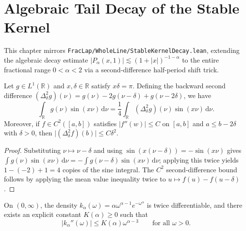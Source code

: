 \chapter{Algebraic Tail Decay of the Stable Kernel}

This chapter mirrors \texttt{FracLap/WholeLine/StableKernelDecay.lean}, extending the algebraic decay estimate $\lvert P_\alpha(x, 1) \rvert \lesssim (1 + \lvert x \rvert)^{-1-\alpha}$ to the entire fractional range $0 < \alpha < 2$ via a second-difference half-period shift trick.

\begin{lemma}\label{lem:sin_second_diff_identity}
\leanok
Let $g \in L^1(\mathbb{R})$ and $x, \delta \in \mathbb{R}$ satisfy $x \delta = \pi$. Defining the backward second difference $(\Delta_\delta^2 g)(\nu) = g(\nu) - 2 g(\nu - \delta) + g(\nu - 2\delta)$, we have
\[
  \int_{\mathbb{R}} g(\nu) \sin(x \nu)\, \mathrm{d}\nu = \frac{1}{4} \int_{\mathbb{R}} (\Delta_\delta^2 g)(\nu) \sin(x \nu)\, \mathrm{d}\nu.
\]
Moreover, if $f \in C^2([a, b])$ satisfies $\lvert f''(w) \rvert \le C$ on $[a, b]$ and $a \le b - 2\delta$ with $\delta > 0$, then $\lvert (\Delta_\delta^2 f)(b) \rvert \le C \delta^2$.
\end{lemma}

\begin{proof}
\leanok
Substituting $\nu \mapsto \nu - \delta$ and using $\sin(x(\nu - \delta)) = -\sin(x\nu)$ gives $\int g(\nu)\sin(x\nu)\,\mathrm{d}\nu = -\int g(\nu - \delta)\sin(x\nu)\,\mathrm{d}\nu$; applying this twice yields $1 - (-2) + 1 = 4$ copies of the sine integral. The $C^2$ second-difference bound follows by applying the mean value inequality twice to $u \mapsto f(u) - f(u - \delta)$.
\end{proof}

\begin{lemma}\label{lem:stable_density_second_deriv}
\leanok
On $(0, \infty)$, the density $k_\alpha(\omega) = \alpha \omega^{\alpha - 1} e^{-\omega^\alpha}$ is twice differentiable, and there exists an explicit constant $K(\alpha) \ge 0$ such that
\[
  \lvert k_\alpha''(\omega) \rvert \le K(\alpha) \omega^{\alpha - 3} \qquad \text{for all } \omega > 0.
\]
\end{lemma}

